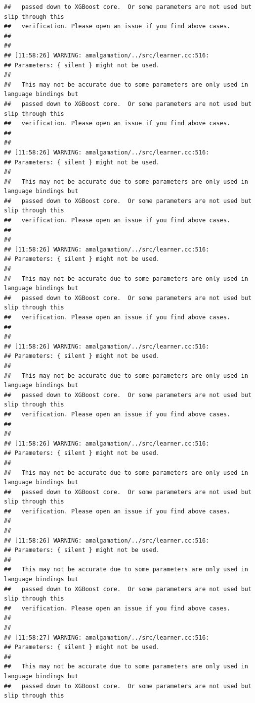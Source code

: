\documentclass[AMS,STIX2COL]{WileyNJD-v2}\usepackage[]{graphicx}\usepackage[]{color}
\makeatletter
\newenvironment{kframe}{%
 \def\at@end@of@kframe{}%
 \ifinner\ifhmode%
  \def\at@end@of@kframe{\end{minipage}}%
  \begin{minipage}{\columnwidth}%
 \fi\fi%
 \def\FrameCommand##1{\hskip\@totalleftmargin \hskip-\fboxsep
 \colorbox{shadecolor}{##1}\hskip-\fboxsep
     \hskip-\linewidth \hskip-\@totalleftmargin \hskip\columnwidth}%
 \MakeFramed {\advance\hsize-\width
   \@totalleftmargin\z@ \linewidth\hsize
   \@setminipage}}%
 {\par\unskip\endMakeFramed%
 \at@end@of@kframe}
\newenvironment{knitrout}{}{} %
\makeatother
\begin{document}
\begin{knitrout}
\begin{kframe}
\begin{verbatim}
##   passed down to XGBoost core.  Or some parameters are not used but slip through this
##   verification. Please open an issue if you find above cases.
## 
## 
## [11:58:26] WARNING: amalgamation/../src/learner.cc:516: 
## Parameters: { silent } might not be used.
## 
##   This may not be accurate due to some parameters are only used in language bindings but
##   passed down to XGBoost core.  Or some parameters are not used but slip through this
##   verification. Please open an issue if you find above cases.
## 
## 
## [11:58:26] WARNING: amalgamation/../src/learner.cc:516: 
## Parameters: { silent } might not be used.
## 
##   This may not be accurate due to some parameters are only used in language bindings but
##   passed down to XGBoost core.  Or some parameters are not used but slip through this
##   verification. Please open an issue if you find above cases.
## 
## 
## [11:58:26] WARNING: amalgamation/../src/learner.cc:516: 
## Parameters: { silent } might not be used.
## 
##   This may not be accurate due to some parameters are only used in language bindings but
##   passed down to XGBoost core.  Or some parameters are not used but slip through this
##   verification. Please open an issue if you find above cases.
## 
## 
## [11:58:26] WARNING: amalgamation/../src/learner.cc:516: 
## Parameters: { silent } might not be used.
## 
##   This may not be accurate due to some parameters are only used in language bindings but
##   passed down to XGBoost core.  Or some parameters are not used but slip through this
##   verification. Please open an issue if you find above cases.
## 
## 
## [11:58:26] WARNING: amalgamation/../src/learner.cc:516: 
## Parameters: { silent } might not be used.
## 
##   This may not be accurate due to some parameters are only used in language bindings but
##   passed down to XGBoost core.  Or some parameters are not used but slip through this
##   verification. Please open an issue if you find above cases.
## 
## 
## [11:58:26] WARNING: amalgamation/../src/learner.cc:516: 
## Parameters: { silent } might not be used.
## 
##   This may not be accurate due to some parameters are only used in language bindings but
##   passed down to XGBoost core.  Or some parameters are not used but slip through this
##   verification. Please open an issue if you find above cases.
## 
## 
## [11:58:27] WARNING: amalgamation/../src/learner.cc:516: 
## Parameters: { silent } might not be used.
## 
##   This may not be accurate due to some parameters are only used in language bindings but
##   passed down to XGBoost core.  Or some parameters are not used but slip through this

\end{verbatim}
\end{kframe}
\end{knitrout}
\end{document}
